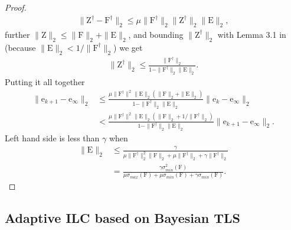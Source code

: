 \documentclass[10pt,a4paper]{article}
\theoremstyle{plain}
\theoremstyle{definition}
\newcommand{\boldvec}[1]{\boldsymbol{\mathrm{#1}}}
\let\vec\boldvec
\newcommand{\error}{\vec{e}} %
\newcommand{\latentMat}{\vec{Z}} %
\newcommand{\errorMat}{\vec{E}} %
\newcommand{\lmatrix}{\vec{L}} %
\newcommand{\systemMat}{\vec{F}} %
\begin{document}
\begin{proof}
%
\begin{align}
\|\latentMat^{\dagger} - \systemMat^{\dagger}\|_{2} \leq \mu \|\systemMat^{\dagger}\|_2 \|\latentMat^{\dagger}\|_2 \|\errorMat\|_2,
\end{align}
%
further $\|\latentMat\|_2 \leq \|\systemMat\|_2 + \|\errorMat\|_2$, and bounding $\|\latentMat^{\dagger}\|_2$ with Lemma 3.1 in \cite{Wedin73} (because $\|\errorMat\|_2 < 1/\|\systemMat^{\dagger}\|_2$) we get
%
\begin{align}
\|\latentMat^{\dagger}\|_2 \leq \frac{\|\systemMat^{\dagger}\|_2}{1 - \|\systemMat^{\dagger}\|_2\|\errorMat\|_2}.
\end{align}
%
Putting it all together
%
\begin{align}
\|\error_{k+1} - \error_{\infty}\|_2 &\leq \frac{\mu \|\systemMat^{\dagger}\|^{2}\|\errorMat\|_2(\|\systemMat\|_2 + \|\errorMat\|_2)}{1 - \|\systemMat^{\dagger}\|_2\|\errorMat\|_2}\|\error_{k} - \error_{\infty}\|_2 \\
&<  \frac{\mu \|\systemMat^{\dagger}\|^{2}\|\errorMat\|_2(\|\systemMat\|_2 + 1/\|\systemMat^{\dagger}\|_2)}{1 - \|\systemMat^{\dagger}\|_2\|\errorMat\|_2}\|\error_{k+1} - \error_{\infty}\|_2.
\end{align}
%
Left hand side is less than $\gamma$ when
%
\begin{align}
\|\errorMat\|_2 &\leq \frac{\gamma}{\mu\|\systemMat^{\dagger}\|_2^{2}\|\systemMat\|_2 + \mu\|\systemMat^{\dagger}\|_2 + \gamma\|\systemMat^{\dagger}\|_2} \\
&= \frac{\gamma\sigma_{min}^{2}(\systemMat)}{\mu\sigma_{max}(\systemMat) + \mu\sigma_{min}(\systemMat) + \gamma\sigma_{min}(\systemMat)}.
\end{align}

%
\end{proof}
%
%

\subsection{Adaptive ILC based on Bayesian TLS}\label{adaptiveILC}
\end{document}
